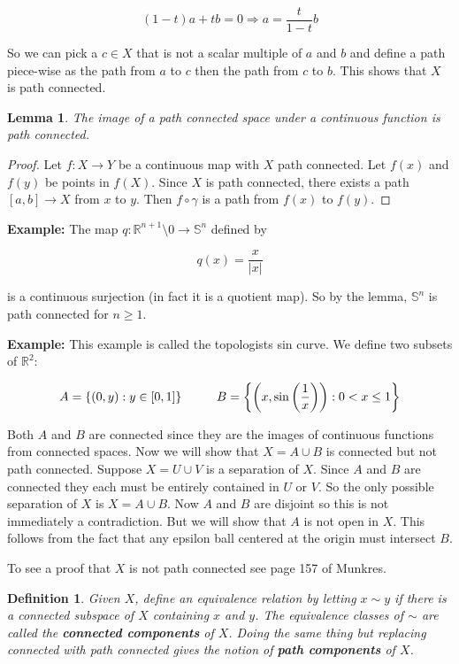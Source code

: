 \documentclass[a4paper]{article}
\newtheorem{lemma}[theorem]{Lemma}
\newtheorem{definition}[theorem]{Definition}
\numberwithin{theorem}{section}
\begin{document}
$$ (1-t)a + tb = 0 \Rightarrow a = \frac{t}{1-t} b $$

So we can pick a $c \in X$ that is not a scalar multiple of $a$ and $b$ and define a path piece-wise as the path from $a$ to $c$ then the path from $c$ to $b$. This shows that $X$ is path connected.

\begin{lemma}
The image of a path connected space under a continuous function is path connected.
\end{lemma}

\begin{proof}
Let $f: X \rightarrow Y$ be a continuous map with $X$ path connected. Let $f(x)$ and $f(y)$ be points in $f(X)$. Since $X$ is path connected, there exists a path $[a,b] \rightarrow X$ from $x$ to $y$. Then $f \circ \gamma$ is a path from $f(x)$ to $f(y)$.
\end{proof}

\textbf{Example:} The map $q: \mathbb{R}^{n+1}\setminus 0 \rightarrow \mathbb{S}^n$ defined by

$$ q(x) = \frac{x}{|x|} $$

is a continuous surjection (in fact it is a quotient map). So by the lemma, $\mathbb{S}^n$ is path connected for $n \geq 1$.

\textbf{Example:} This example is called the topologists sin curve. We define two subsets of $\mathbb{R}^2$:

$$ A = \{(0,y) : y \in [0,1]\} \hspace{1 cm} B = \left\{\left(x,\sin \left(\frac{1}{x}\right)\right): 0 < x \leq 1\right\} $$

Both $A$ and $B$ are connected since they are the images of continuous functions from connected spaces. Now we will show that $X = A \cup B$ is connected but not path connected. Suppose $X = U \cup V$ is a separation of $X$. Since $A$ and $B$ are connected they each must be entirely contained in $U$ or $V$. So the only possible separation of $X$ is $X = A \cup B$. Now $A$ and $B$ are disjoint so this is not immediately a contradiction. But we will show that $A$ is not open in $X$. This follows from the fact that any epsilon ball centered at the origin must intersect $B$.

To see a proof that $X$ is not path connected see page 157 of Munkres. 

\begin{definition}
Given $X$, define an equivalence relation by letting $x \sim y$ if there is a connected subspace of $X$ containing $x$ and $y$. The equivalence classes of $\sim$ are called the \textbf{connected components} of $X$. Doing the same thing but replacing connected with path connected gives the notion of \textbf{path components} of $X$.
\end{definition}
\end{document}
